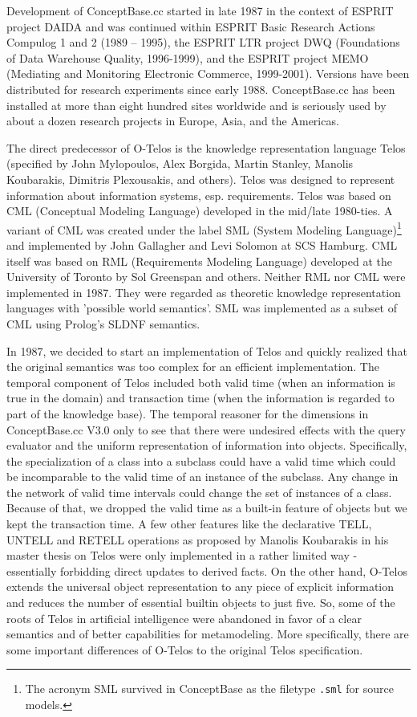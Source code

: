 Development of ConceptBase.cc started in late 1987 in the context of
ESPRIT project DAIDA \cite{JARK93} and was continued within
ESPRIT Basic Research Actions Compulog 1 and 2 (1989 -- 1995), the
ESPRIT LTR project DWQ (Foundations of Data Warehouse Quality, 1996-1999),
and the ESPRIT project MEMO (Mediating and Monitoring Electronic Commerce, 1999-2001).
Versions have been distributed for research experiments since early 1988.
ConceptBase.cc has been installed at more
than eight hundred sites worldwide and is seriously used by about a dozen research projects in
Europe, Asia, and the Americas.

The direct predecessor of O-Telos is the knowledge representation language Telos (specified by 
John Mylopoulos, Alex Borgida, Martin Stanley, Manolis Koubarakis, Dimitris Plexousakis, and others). 
Telos was designed to represent information about information systems, esp. requirements. 
Telos was based on CML (Conceptual Modeling Language) developed in the mid/late 1980-ties. 
A variant of CML was created under the label SML (System Modeling Language)\footnote{
   The acronym SML survived in ConceptBase as the filetype {\tt .sml} for source models.
}
and 
implemented by John Gallagher and Levi Solomon at SCS Hamburg. CML itself was based on 
RML (Requirements Modeling Language) developed at the University of Toronto by Sol Greenspan and others.
Neither RML nor CML were implemented in 1987. They were regarded as theoretic 
knowledge representation languages with 'possible world semantics'. 
SML was implemented as a subset of CML using Prolog's SLDNF semantics. 

In 1987, we decided to start an implementation of Telos and quickly realized that the original semantics 
was too complex for an efficient implementation. The temporal component of Telos included 
both valid time (when an information is true in the domain) and transaction time 
(when the information is regarded to part of the knowledge base). The temporal reasoner for the 
dimensions in ConceptBase.cc V3.0 only to see that there were undesired effects with the query evaluator 
and the uniform representation of information into objects. Specifically, the specialization of a 
class into a subclass could have a valid time which could be incomparable to the valid time of an 
instance of the subclass. Any change in the network of valid time intervals could change the 
set of instances of a class. Because of that, we dropped the valid time as a built-in feature of 
objects but we kept the transaction time. A few other features like the declarative TELL, UNTELL 
and RETELL operations as proposed by Manolis Koubarakis in his master thesis on Telos were 
only implemented in a rather limited way - essentially forbidding direct updates to derived facts. 
On the other hand, O-Telos extends the universal object representation to any piece of explicit 
information and reduces the number of essential builtin objects to just five. 
So, some of the roots of Telos in artificial intelligence were abandoned in favor 
of a clear semantics and of better capabilities for metamodeling.
More specifically, there are some important differences of O-Telos to the original Telos specification.

